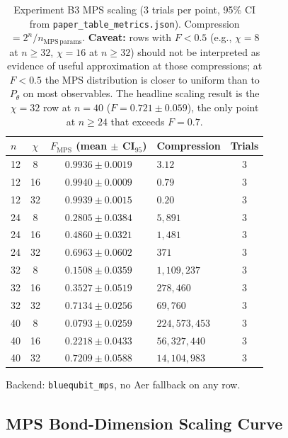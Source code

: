 \documentclass[conference,10pt]{IEEEtran}
\begin{document}
\begin{table}[t]
\centering
\caption{Experiment B3 MPS scaling (3 trials per point, 95\% CI from \texttt{paper\_table\_metrics.json}). Compression $={2^n}/{n_{\mathrm{MPS\,params}}}$. \textbf{Caveat:} rows with $F < 0.5$ (e.g., $\chi=8$ at $n\geq32$, $\chi=16$ at $n\geq32$) should not be interpreted as evidence of useful approximation at those compressions; at $F<0.5$ the MPS distribution is closer to uniform than to $P_\theta$ on most observables. The headline scaling result is the $\chi=32$ row at $n=40$ ($F=0.721\pm0.059$), the only point at $n\geq24$ that exceeds $F=0.7$.}
\label{tab:mps_scaling}
\begin{tabular}{lcc p{2.3cm} c}
\toprule
\textbf{$n$} & \textbf{$\chi$} & \textbf{$F_{\mathrm{MPS}}$ (mean$\,\pm\,$CI$_{95}$)} & \textbf{Compression} & \textbf{Trials} \\
\midrule
12 &  8 & $0.9936 \pm 0.0019$ &           $3.12$ & 3 \\
12 & 16 & $0.9940 \pm 0.0009$ &           $0.79$ & 3 \\
12 & 32 & $0.9939 \pm 0.0015$ &           $0.20$ & 3 \\
\midrule
24 &  8 & $0.2805 \pm 0.0384$ &        $5{,}891$ & 3 \\
24 & 16 & $0.4860 \pm 0.0321$ &        $1{,}481$ & 3 \\
24 & 32 & $0.6963 \pm 0.0602$ &          $371$ & 3 \\
\midrule
32 &  8 & $0.1508 \pm 0.0359$ &  $1{,}109{,}237$ & 3 \\
32 & 16 & $0.3527 \pm 0.0519$ &    $278{,}460$ & 3 \\
32 & 32 & $0.7134 \pm 0.0256$ &     $69{,}760$ & 3 \\
\midrule
40 &  8 & $0.0793 \pm 0.0259$ & $224{,}573{,}453$ & 3 \\
40 & 16 & $0.2218 \pm 0.0433$ &  $56{,}327{,}440$ & 3 \\
40 & 32 & $0.7209 \pm 0.0588$ &  $14{,}104{,}983$ & 3 \\
\bottomrule
\end{tabular}
\par\smallskip
{\footnotesize Backend: \texttt{bluequbit\_mps}, no Aer fallback on any row.}
\end{table}

\subsection{MPS Bond-Dimension Scaling Curve}
\end{document}
